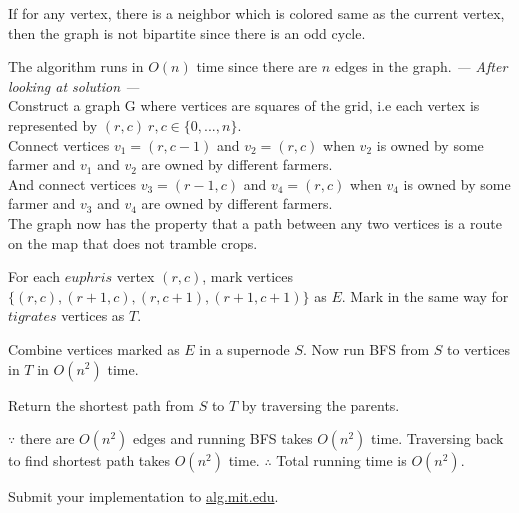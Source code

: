 \documentclass[12pt,twoside]{article}
\begin{document}
\begin{problems}
If for any vertex, there is a neighbor which is colored same as the current vertex, then the graph is not bipartite since there is an odd cycle.

The algorithm runs in $O(n)$ time since there are $n$
 edges in the graph.
\newpage
\problem  %
\textit{--- After looking at solution ---} \\

Construct a graph G where vertices are squares of the grid, i.e each vertex is represented by $(r, c)\ r,c \in \{0, ..., n\}$. \\

Connect vertices $v_1 = (r, c-1)$ and $v_2 = (r, c)$ when $v_2$ is owned by some farmer and $v_1$ and $v_2$ are owned by different farmers. \\
And connect vertices $v_3 = (r-1, c)$ and $v_4 = (r, c)$ when $v_4$ is owned by some farmer and $v_3$ and $v_4$ are owned by different farmers. \\

The graph now has the property that a path between any two vertices is a route on the map that does not tramble crops.

For each $euphris$ vertex $(r, c)$, mark vertices $\{(r, c), (r+1, c), (r, c+1), (r+1, c+1)\}$ as $E$. Mark in the same way for $tigrates$ vertices as $T$.

Combine vertices marked as $E$ in a supernode $S$. Now run BFS from $S$ to vertices in $T$ in $O(n^2)$ time. 
 
Return the shortest path from $S$ to $T$ by traversing the parents.

$\because$ there are $O(n^2)$ edges and running BFS takes $O(n^2)$ time. Traversing back to find shortest path takes $O(n^2)$ time. $\therefore$ Total running time is $O(n^2)$.


\newpage
\problem  %

\newpage
\problem  %

\begin{problemparts}
\problempart %
\problempart %
\problempart %
\problempart Submit your implementation to {\small\url{alg.mit.edu}}.
\end{problemparts}

\end{problems}
\end{document}

